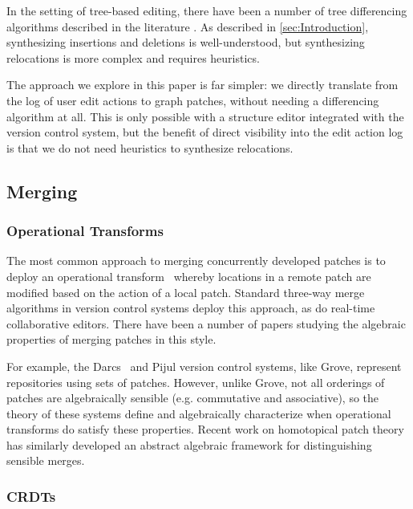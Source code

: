 In the setting of tree-based editing, there have been a number of tree differencing algorithms described in the literature \cite{DBLP:conf/esa/Klein98,DBLP:journals/tcs/Bille05,DBLP:journals/talg/DemaineMRW09,DBLP:journals/fuin/AratsuHK10,DBLP:conf/sigmod/ChawatheG97, DBLP:journals/tse/FluriWPG07,DBLP:conf/kbse/FalleriMBMM14,DBLP:conf/doceng/Lindholm04,DBLP:conf/fase/NguyenNPN10,DBLP:journals/scp/SchwagerlUW15}. 
As described in \autoref{sec:Introduction}, synthesizing insertions and deletions is well-understood, but synthesizing relocations is more complex and requires heuristics.

The approach we explore in this paper is far simpler: we directly translate from the log of user edit actions to graph patches, without needing a differencing algorithm at all. This is only possible with a structure editor integrated with the version control system, but the benefit of direct visibility into the edit action log is that we do not need heuristics to synthesize relocations.

\subsection{Merging}
\subsubsection{Operational Transforms}
The most common approach to merging concurrently developed patches is to deploy an operational transform~\cite{DBLP:conf/sigmod/EllisG89} whereby locations in a remote patch are modified based on the action of a local patch. Standard three-way merge algorithms in version control systems deploy this approach, as do real-time collaborative editors. There have been a number of papers studying the algebraic properties of merging patches in this style. 

For example, the Darcs~\cite{DBLP:conf/haskell/Roundy05} and Pijul version control systems, like Grove, represent repositories using sets of patches. However, unlike Grove, not all orderings of patches are algebraically sensible (e.g. commutative and associative), so the theory of these systems define and algebraically characterize when operational transforms do satisfy these properties. Recent work on homotopical patch theory \cite{DBLP:journals/jfp/AngiuliMLH16} has similarly developed an abstract algebraic framework for distinguishing sensible merges. 

\subsubsection{CRDTs}

